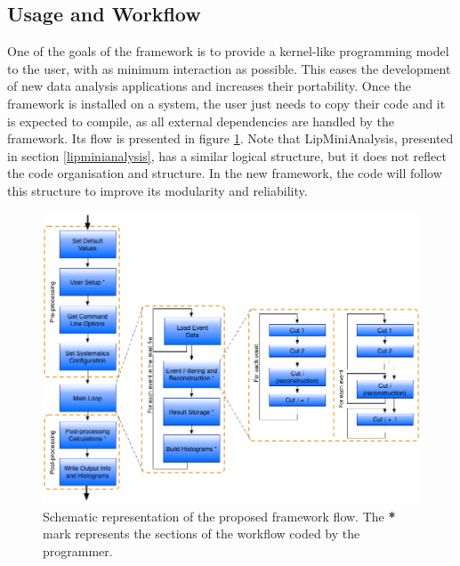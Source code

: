 \subsection{Usage and Workflow}
\label{usage_workflow}

One of the goals of the framework is to provide a kernel-like programming model to the user, with as minimum interaction as possible. This eases the development of new data analysis applications and increases their portability. Once the framework is installed on a system, the user just needs to copy their code and it is expected to compile, as all external dependencies are handled by the framework. Its flow is presented in figure \ref{fig:new_framework_flow}. Note that LipMiniAnalysis, presented in section \ref{lipminianalysis}, has a similar logical structure, but it does not reflect the code organisation and structure. In the new framework, the code will follow this structure to improve its modularity and reliability.

\begin{figure}[!htp]
	\begin{center}
		\includegraphics[scale=0.5]{imgs/new_framework_flow.png}
		\caption{Schematic representation of the proposed framework flow. The \textbf{*} mark represents the sections of the workflow coded by the programmer.}
		\label{fig:new_framework_flow}
	\end{center}
\end{figure}

